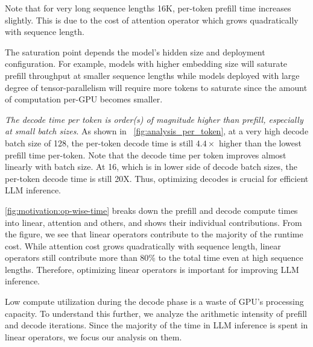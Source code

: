 Note that for very long sequence lengths \eg 16K, per-token prefill time increases slightly. This is due to the cost of attention operator which grows quadratically with sequence length.

The saturation point depends the model's hidden size and deployment configuration. For example, models with higher embedding size will saturate prefill throughput at smaller sequence lengths while models deployed with large degree of tensor-parallelism will require more tokens to saturate since the amount of computation per-GPU becomes smaller.


 \textit{The decode time per token is order(s) of magnitude higher than prefill, especially at small batch sizes}. As shown in ~\autoref{fig:analysis_per_token}, at a very high decode batch size of 128, the per-token decode time is still $4.4\times$ higher than the lowest prefill time per-token. Note that the decode time per token improves almost linearly with batch size. At 16, which is in lower side of decode batch sizes, the per-token decode time is still 20X. Thus, optimizing decodes is crucial for efficient LLM inference.
\fi

\autoref{fig:motivation:op-wise-time} breaks down the prefill and decode compute times into linear, attention and others, and shows their individual contributions. From the figure, we see that linear operators contribute to the majority of the runtime cost.  While attention cost grows quadratically with sequence length, linear operators still contribute more than 80\% to the total time even at high sequence lengths. Therefore, optimizing linear operators is important for improving LLM inference.



 Low compute utilization during the decode phase is a waste of GPU's processing capacity. To understand this further, we analyze the arithmetic intensity of prefill and decode iterations. Since the majority of the time in LLM inference is spent in linear operators, we focus our analysis on them.





